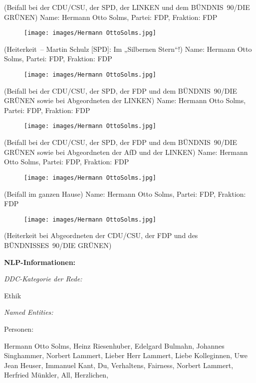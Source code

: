 \documentclass[10pt, a4paper]{report}
\begin{document}
(Beifall bei der CDU/CSU, der SPD, der LINKEN und dem BÜNDNIS 90/DIE GRÜNEN)
Name: Hermann Otto Solms, Partei: FDP, Fraktion: FDP

\begin{figure}[!ht]
\texttt{[image: images/Hermann OttoSolms.jpg]}
\end{figure}


(Heiterkeit – Martin Schulz [SPD]: Im „Silbernen Stern“!)
Name: Hermann Otto Solms, Partei: FDP, Fraktion: FDP

\begin{figure}[!ht]
\texttt{[image: images/Hermann OttoSolms.jpg]}
\end{figure}


(Beifall bei der CDU/CSU, der SPD, der FDP und dem BÜNDNIS 90/DIE GRÜNEN sowie bei Abgeordneten der LINKEN)
Name: Hermann Otto Solms, Partei: FDP, Fraktion: FDP

\begin{figure}[!ht]
\texttt{[image: images/Hermann OttoSolms.jpg]}
\end{figure}


(Beifall bei der CDU/CSU, der SPD, der FDP und dem BÜNDNIS 90/DIE GRÜNEN sowie bei Abgeordneten der AfD und der LINKEN)
Name: Hermann Otto Solms, Partei: FDP, Fraktion: FDP

\begin{figure}[!ht]
\texttt{[image: images/Hermann OttoSolms.jpg]}
\end{figure}


(Beifall im ganzen Hause)
Name: Hermann Otto Solms, Partei: FDP, Fraktion: FDP

\begin{figure}[!ht]
\texttt{[image: images/Hermann OttoSolms.jpg]}
\end{figure}


(Heiterkeit bei Abgeordneten der CDU/CSU, der FDP und des BÜNDNISSES 90/DIE GRÜNEN)


\textbf{NLP-Informationen:}

\textit{DDC-Kategorie der Rede:}

Ethik

\textit{Named Entities:}

Personen:

Hermann Otto Solms, Heinz Riesenhuber, Edelgard Bulmahn, Johannes Singhammer, Norbert Lammert, Lieber Herr Lammert, Liebe Kolleginnen, Uwe Jean Heuser, Immanuel Kant, Du, Verhaltens, Fairness, Norbert Lammert, Herfried Münkler, All, Herzlichen, 
\end{document}
